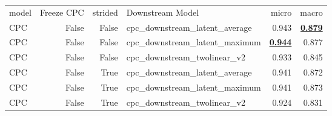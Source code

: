 \begin{adjustbox}{width=\textwidth}
\begin{tabular}{lrrlrr}
{model} & {Freeze CPC} & {strided} & {Downstream Model} & {micro} & {macro} \\
CPC & False & False & cpc\_downstream\_latent\_average & 0.943 & \bfseries \underline{0.879} \\
CPC & False & False & cpc\_downstream\_latent\_maximum & \bfseries \underline{0.944} & 0.877 \\
CPC & False & False & cpc\_downstream\_twolinear\_v2 & 0.933 & 0.845 \\
CPC & False & True & cpc\_downstream\_latent\_average & 0.941 & 0.872 \\
CPC & False & True & cpc\_downstream\_latent\_maximum & 0.941 & 0.873 \\
CPC & False & True & cpc\_downstream\_twolinear\_v2 & 0.924 & 0.831 \\
\end{tabular}
\end{adjustbox}